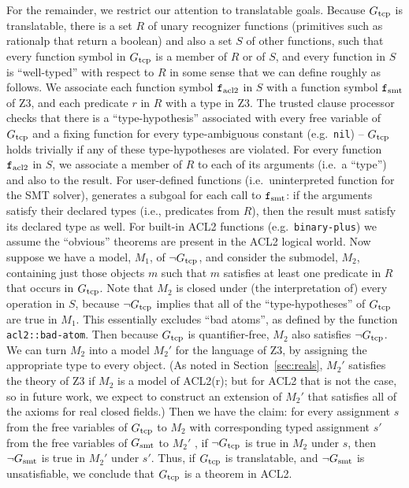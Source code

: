 For the remainder, we restrict our attention to translatable goals.
Because $G_{\mathrm{tcp}}$ is translatable, there is a set $R$ of unary recognizer functions
(primitives such as rationalp that return a boolean) and also a set $S$ of other
functions, such that every function symbol in $G_{\mathrm{tcp}}$ is a member of $R$ or of $S$,
and every function in $S$ is ``well-typed'' with respect to $R$ in some sense that
we can define roughly as follows.
We associate each function symbol $\mathtt{f}_{\mathrm{acl2}}$ in $S$ with a function symbol $\mathtt{f}_{\mathrm{smt}}$
of Z3, and each predicate $r$ in $R$ with a type in Z3.
The trusted clause processor checks that there is a ``type-hypothesis'' associated
with every free variable of $G_{\mathrm{tcp}}$ and a fixing function for every type-ambiguous
constant (e.g.\ \texttt{nil}) -- $G_{\mathrm{tcp}}$ holds trivially if any of these
type-hypotheses are violated.
For every function $\mathtt{f}_{\mathrm{acl2}}$ in $S$, we associate a member of $R$ to each of its
arguments (i.e.\ a ``type'') and also to the result.
For user-defined functions (i.e.\ uninterpreted function for the SMT solver),
\smtlink{} generates a subgoal for each call to $\mathtt{f}_{\mathrm{smt}}$: if the arguments satisfy
their declared types (i.e., predicates from $R$), then the result must satisfy its
declared type as well.
For built-in ACL2 functions (e.g.\ \texttt{binary-plus}) we assume the ``obvious''
theorems are present in the ACL2 logical world.
Now suppose we have a model, $M_1$, of $\neg G_{\mathrm{tcp}}$, and consider the submodel,
$M_2$, containing just those objects $m$ such that $m$ satisfies at least one
predicate in $R$ that occurs in $G_{\mathrm{tcp}}$. Note that $M_2$ is closed
under (the interpretation of) every operation in $S$, because $\neg G_{\mathrm{tcp}}$
implies that all of the ``type-hypotheses'' of $G_{\mathrm{tcp}}$ are true in $M_1$. This
essentially excludes ``bad atoms'', as defined by the function
\texttt{acl2::bad-atom}.
Then because $G_{\mathrm{tcp}}$ is quantifier-free, $M_2$ also satisfies $\neg G_{\mathrm{tcp}}$.
We can turn $M_2$ into a model $M_2'$ for the language of Z3, by assigning the
appropriate type to every object.  (As noted in Section~\ref{sec:reals}, $M_2'$
satisfies the theory of Z3 if $M_2$ is a model of ACL2(r); but for ACL2 that is
not the case, so in future work, we expect to construct an extension of $M_2'$
that satisfies all of the axioms for real closed fields.)
Then we have the claim: for every assignment $s$ from the free
variables of $G_{\mathrm{tcp}}$ to $M_2$ with corresponding typed assignment $s'$ from the
free variables of $G_{\mathrm{smt}}$ to $M_2'$ , if $\neg G_{\mathrm{tcp}}$ is true in $M_2$
under $s$, then $\neg G_{\mathrm{smt}}$ is true in $M_2'$ under $s'$.
Thus, if $G_{\mathrm{tcp}}$ is translatable, and $\neg G_{\mathrm{smt}}$ is unsatisfiable, we conclude
that $G_{\mathrm{tcp}}$ is a theorem in ACL2.


